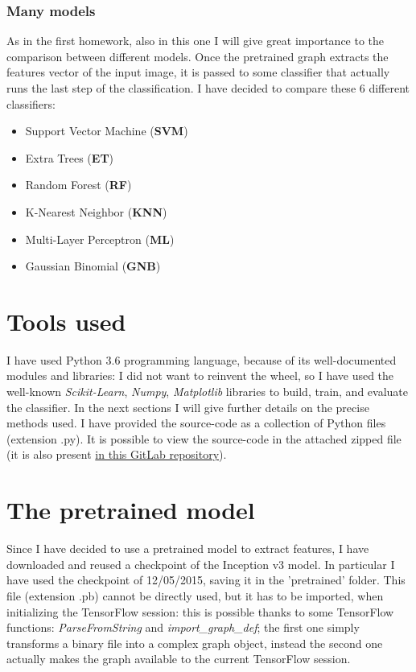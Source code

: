 \documentclass[12pt]{article}
\begin{document}
\subsubsection{Many models}
\label{sec:models}
As in the first homework, also in this one I will give great importance to the comparison between different models. Once the pretrained graph extracts the features vector of the input image, it is passed to some classifier that actually runs the last step of the classification. I have decided to compare these 6 different classifiers:
\begin{itemize}
	\item Support Vector Machine (\textbf{SVM})
	\item Extra Trees (\textbf{ET})
	\item Random Forest (\textbf{RF})
	\item K-Nearest Neighbor (\textbf{KNN})
	\item Multi-Layer Perceptron (\textbf{ML})
	\item Gaussian Binomial (\textbf{GNB})
\end{itemize}

\section{Tools used}
I have used Python 3.6 programming language, because of its well-documented modules and libraries: I did not want to reinvent the wheel, so I have used the well-known \textit{Scikit-Learn}, \textit{Numpy}, \textit{Matplotlib} libraries to build, train, and evaluate the classifier. In the next sections I will give further details on the precise methods used.
I have provided the source-code as a collection of Python files (extension .py). It is possible to view the source-code in the attached zipped file (it is also present \href{https://www.gitlab.com/lrusso96/machine-learning}{in this GitLab repository}).

\section{The pretrained model}
Since I have decided to use a pretrained model to extract features, I have downloaded and reused a checkpoint of the Inception v3 model. In particular I have used the checkpoint of 12/05/2015, saving it in the 'pretrained' folder. This file (extension .pb) cannot be directly used, but it has to be imported, when initializing the TensorFlow session: this is possible thanks to some TensorFlow functions: \textit{ParseFromString} and \textit{import\_graph\_def}; the first one simply transforms a binary file into a complex graph object, instead the second one actually makes the graph available to the current TensorFlow session.
\end{document}

